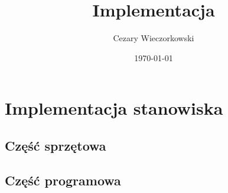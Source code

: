 \documentclass[../main.tex]{subfiles}
\author{Cezary Wieczorkowski}
\date{\today}
\title{Implementacja}
\begin{document}
\section{Implementacja stanowiska}

\subsection{Część sprzętowa}

\subsection{Część programowa}
\end{document}
